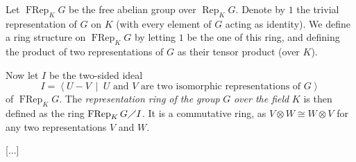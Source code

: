 \documentclass[12pt,final,notitlepage,onecolumn,german]{article}%
\begin{document}
Let $\operatorname*{FRep}_{K}G$ be the free abelian group over
$\operatorname*{Rep}_{K}G$. Denote by $1$ the trivial representation of $G$ on
$K$ (with every element of $G$ acting as identity). We define a ring structure
on $\operatorname*{FRep}_{K}G$ by letting $1$ be the one of this ring, and
defining the product of two representations of $G$ as their tensor product
(over $K$).

Now let $I$ be the two-sided ideal%
\[
I=\left\langle U-V\ \mid\ U\text{ and }V\text{ are two isomorphic
representations of }G\right\rangle
\]
of $\operatorname*{FRep}_{K}G$. The \textit{representation ring of the group
}$G$\textit{ over the field }$K$ is then defined as the ring
$\operatorname*{FRep}_{K}G\diagup I$. It is a commutative ring, as $V\otimes
W\cong W\otimes V$ for any two representations $V$ and $W$.

[...]

\begin{center}
\end{center}
\end{document}
